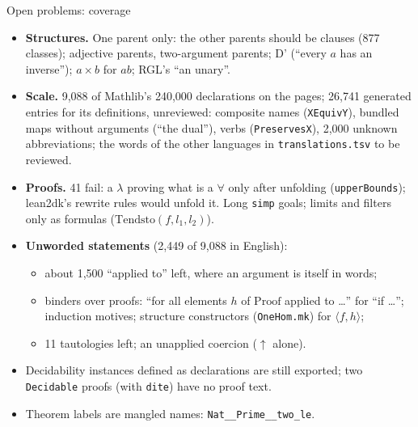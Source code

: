 \documentclass[10pt,aspectratio=169]{beamer}
\newcommand{\bad}[1]{\textcolor{warn}{#1}}
\begin{document}
\begin{frame}{Open problems: coverage}
  \footnotesize
  \begin{itemize}
    \item \textbf{Structures.} One parent only: the other parents should be clauses (877
          classes); adjective parents, two-argument parents; D' (``every $a$ has an inverse'');
          $a \times b$ for $ab$; RGL's \bad{``an unary''}.
    \item \textbf{Scale.} 9,088 of Mathlib's 240,000 declarations on the pages; 26,741
          generated entries for its definitions, unreviewed: composite names
          (\texttt{XEquivY}), bundled maps without arguments (\bad{``the dual''}), verbs
          (\texttt{PreservesX}), 2,000 unknown abbreviations; the words of the other
          languages in \texttt{translations.tsv} to be reviewed.
    \item \textbf{Proofs.} 41 fail: a $\lambda$ proving what is a $\forall$ only after unfolding
          (\texttt{upperBounds}); lean2dk's rewrite rules would unfold it. Long \texttt{simp}
          goals; limits and filters only as formulas ($\mathrm{Tendsto}(f, l_1, l_2)$).
    \item \textbf{Unworded statements} (2,449 of 9,088 in English):
      \begin{itemize}
        \item about 1,500 ``applied to'' left, where an argument is itself in words;
        \item binders over proofs: ``for all elements $h$ of \bad{$\mathrm{Proof}$ applied to}
              \ldots'' for ``if \ldots''; induction motives; structure constructors
              (\texttt{OneHom.mk}) for $\langle f, h\rangle$;
        \item 11 tautologies left; an unapplied coercion ($\uparrow$ alone).
      \end{itemize}
    \item Decidability instances defined as declarations are still exported;
          two \texttt{Decidable} proofs (with \texttt{dite}) have no proof text.
    \item Theorem labels are mangled names: \texttt{Nat\_\_Prime\_\_two\_le}.
  \end{itemize}
\end{frame}
\end{document}

